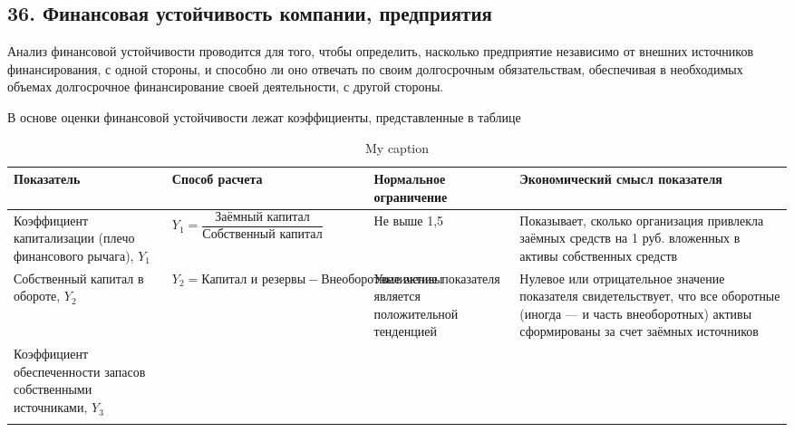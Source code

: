 \subsection*{36. Финансовая устойчивость компании, предприятия}

Анализ финансовой устойчивости проводится для того, чтобы определить, насколько предприятие независимо от внешних источников финансирования, с одной стороны, и способно ли оно отвечать по своим долгосрочным обязательствам, обеспечивая в необходимых объемах долгосрочное финансирование своей деятельности, с другой стороны.

В основе оценки финансовой устойчивости лежат коэффициенты, представленные в таблице

\begin{table}[!ht]
	\small
	\caption{My caption}
	\label{my-label}
	\setlength{\extrarowheight}{1mm}
	\begin{tabularx}{\textwidth}{|p{3cm}|K{4cm}|K{3cm}|K{4cm}|}
		\hline
		Показатель & Способ расчета &Нормальное ограничение&Экономический смысл показателя                                                                                                          \\ \hline
		Коэффициент капитализации (плечо финансового рычага), $Y_1$        & $Y_1 = \dfrac{\text{Заёмный капитал}}{\text{Собственный капитал}}$ & Не выше 1,5                                             & Показывает, сколько организация привлекла заёмных средств на 1 руб. вложенных в активы собственных средств                                                        \\ \hline
		Собственный капитал в обороте, $Y_2$                               & $Y_2 = \text{Капитал и резервы} - \text{Внеоборотные активы}$      & Увеличение показателя является положительной тенденцией & Нулевое или отрицательное значение показателя свидетельствует, что все оборотные (иногда --- и часть внеоборотных) активы сформированы за счет заёмных источников \\ \hline
		Коэффициент обеспеченности запасов собственными источниками, $Y_3$ &                                                                    &                                                         &                                                                                                                                                                   \\ \hline
		&                                                                    &                                                         &                                                                                                                                                                   \\ \hline

\end{tabularx}
\end{table}
